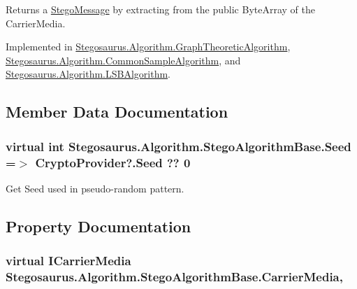 Returns a \hyperlink{class_stegosaurus_1_1_stego_message}{Stego\+Message} by extracting from the public Byte\+Array of the Carrier\+Media. 



Implemented in \hyperlink{class_stegosaurus_1_1_algorithm_1_1_graph_theoretic_algorithm_ae12e30f823e7cedc1f3ae75fa8a914fb}{Stegosaurus.\+Algorithm.\+Graph\+Theoretic\+Algorithm}, \hyperlink{class_stegosaurus_1_1_algorithm_1_1_common_sample_algorithm_aab6487375c07bb4e77c719bb96605ad4}{Stegosaurus.\+Algorithm.\+Common\+Sample\+Algorithm}, and \hyperlink{class_stegosaurus_1_1_algorithm_1_1_l_s_b_algorithm_a4c0597f5f93e47dc5a8ad58d06c9b189}{Stegosaurus.\+Algorithm.\+L\+S\+B\+Algorithm}.



\subsection{Member Data Documentation}
\subsubsection[{\texorpdfstring{Seed}{Seed}}]{\setlength{\rightskip}{0pt plus 5cm}virtual int Stegosaurus.\+Algorithm.\+Stego\+Algorithm\+Base.\+Seed =$>$ {\bf Crypto\+Provider}?.Seed ?? 0\hspace{0.3cm}{\ttfamily [protected]}}\hypertarget{class_stegosaurus_1_1_algorithm_1_1_stego_algorithm_base_a8fb7f33711a582b1e102efa2c85e250f}{}\label{class_stegosaurus_1_1_algorithm_1_1_stego_algorithm_base_a8fb7f33711a582b1e102efa2c85e250f}


Get Seed used in pseudo-\/random pattern. 



\subsection{Property Documentation}
\subsubsection[{\texorpdfstring{Carrier\+Media}{CarrierMedia}}]{\setlength{\rightskip}{0pt plus 5cm}virtual {\bf I\+Carrier\+Media} Stegosaurus.\+Algorithm.\+Stego\+Algorithm\+Base.\+Carrier\+Media\hspace{0.3cm}{\ttfamily [get]}, {\ttfamily [set]}}\hypertarget{class_stegosaurus_1_1_algorithm_1_1_stego_algorithm_base_a5e77d196ee5a592ddf85184743c288e0}{}\label{class_stegosaurus_1_1_algorithm_1_1_stego_algorithm_base_a5e77d196ee5a592ddf85184743c288e0}


